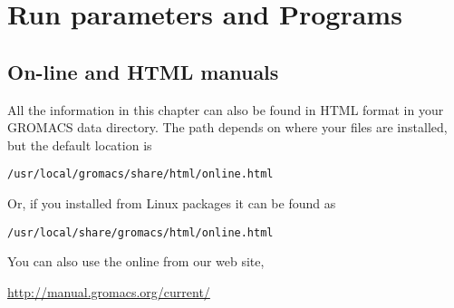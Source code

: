 %
%
%
%
%
%

\chapter{Run parameters and Programs}
\label{ch:programs}

\section{On-line and HTML manuals}
All the information in this chapter can also be found in HTML
format in your GROMACS data directory. The path depends on
where your files are installed, but the default location is \\
\centerline{\tt /usr/local/gromacs/share/html/online.html}
Or, if you installed from Linux packages it can be found as\\
\centerline{\tt /usr/local/share/gromacs/html/online.html}
You can also use the online from our web site,\\
\centerline{\href{http://manual.gromacs.org/current/}{http://manual.gromacs.org/current/}}

